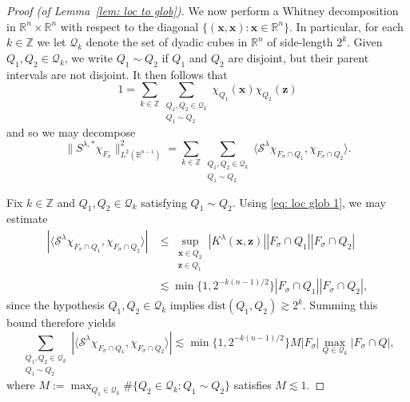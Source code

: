 \documentclass[reqno]{amsart}
\numberwithin{equation}{section}
\newcommand{\B}{\mathbb{B}}
\newcommand{\R}{\mathbb{R}}
\newcommand{\Z}{\mathbb{Z}}
\newcommand{\cQ}{\mathcal{Q}}
\newcommand{\cS}{\mathcal{S}}
\newcommand{\bx}{\mathbf{x}}
\newcommand{\bz}{\mathbf{z}}
\def\inn#1#2{\langle#1,#2\rangle}
\theoremstyle{plain}
\theoremstyle{definition}
\newcommand{\dist}{\mathrm{dist}}
\begin{document}
\begin{proof}[Proof (of Lemma~\ref{lem: loc to glob})]
We now perform a Whitney decomposition in $\R^n \times \R^n$ with respect to the diagonal $\{(\bx, \bx) : \bx \in \R^n\}$. In particular, for each $k \in \Z$ we let $\cQ_k$ denote the set of dyadic cubes in $\R^n$ of side-length $2^k$. Given $Q_1, Q_2 \in \cQ_k$, we write $Q_1 \sim Q_2$ if $Q_1$ and $Q_2$ are disjoint, but their parent intervals are not disjoint. It then follows that
\begin{equation*}
    1 = \sum_{k \in \Z} \sum_{\substack{Q_1, Q_2 \in \cQ_k \\ Q_1 \sim Q_2}} \chi_{Q_1}(\bx) \chi_{Q_2}(\bz)
\end{equation*}
and so we may decompose 
\begin{equation}\label{eq: loc glob 2}
   \|S^{\lambda, *}\chi_{F_{\sigma}}\|_{L^2(\B^{n-1})}^2 = \sum_{k \in \Z} \sum_{\substack{Q_1, Q_2 \in \cQ_k \\ Q_1 \sim Q_2}} \inn{\cS^{\lambda}\chi_{F_{\sigma} \cap Q_1}}{\chi_{F_{\sigma} \cap Q_2}}. 
\end{equation}

Fix $k \in \Z$ and $Q_1, Q_2 \in \cQ_k$ satisfying $Q_1 \sim Q_2$. Using \eqref{eq: loc glob 1}, we may estimate
\begin{align*}
|\inn{\cS^{\lambda}\chi_{F_{\sigma} \cap Q_1}}{\chi_{F_{\sigma} \cap Q_2}}| &\leq \sup_{\substack{\bx \in Q_2 \\ \bz \in Q_1}} |K^{\lambda}(\bx, \bz)| |F_{\sigma} \cap Q_1| |F_{\sigma} \cap Q_2| \\
&\lesssim \min\{1,2^{-k(n-1)/2}\} |F_{\sigma} \cap Q_1| |F_{\sigma} \cap Q_2|,
\end{align*}
since the hypothesis $Q_1, Q_2 \in \cQ_k$ implies $\dist(Q_1, Q_2) \gtrsim 2^k$. Summing this bound therefore yields 
\begin{equation}\label{eq: loc glob 3}
  \sum_{\substack{Q_1, Q_2 \in \cQ_k \\ Q_1 \sim Q_2}} |\inn{\cS^{\lambda}\chi_{F_{\sigma} \cap Q_1}}{\chi_{F_{\sigma} \cap Q_2}}| \lesssim \min\{1,2^{-k(n-1)/2}\} M |F_{\sigma}| \max_{Q \in \cQ_k}|F_{\sigma}\cap Q| ,
\end{equation}
where $M := \max_{Q_1 \in \cQ_k} \#\{Q_2 \in \cQ_k : Q_1 \sim Q_2\}$ satisfies $M \lesssim 1$. 





\end{proof}
\end{document}
